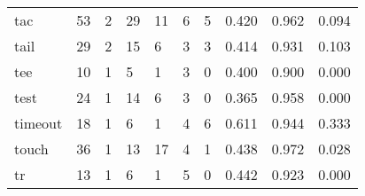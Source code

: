 \begin{longtable}{lp{2.0cm}p{2.0cm}p{2.0cm}p{2.0cm}p{2.0cm}p{2.0cm}p{2.0cm}p{2.0cm}p{2.0cm}}
tac       &                     53 &                                             2 &                                           29 &                                          11 &                                            6 &                                          5 &                                0.420 &                                  0.962 &                                0.094 \\
tail      &                     29 &                                             2 &                                           15 &                                           6 &                                            3 &                                          3 &                                0.414 &                                  0.931 &                                0.103 \\
tee       &                     10 &                                             1 &                                            5 &                                           1 &                                            3 &                                          0 &                                0.400 &                                  0.900 &                                0.000 \\
test      &                     24 &                                             1 &                                           14 &                                           6 &                                            3 &                                          0 &                                0.365 &                                  0.958 &                                0.000 \\
timeout   &                     18 &                                             1 &                                            6 &                                           1 &                                            4 &                                          6 &                                0.611 &                                  0.944 &                                0.333 \\
touch     &                     36 &                                             1 &                                           13 &                                          17 &                                            4 &                                          1 &                                0.438 &                                  0.972 &                                0.028 \\
tr        &                     13 &                                             1 &                                            6 &                                           1 &                                            5 &                                          0 &                                0.442 &                                  0.923 &                                0.000 \\

\end{longtable}
